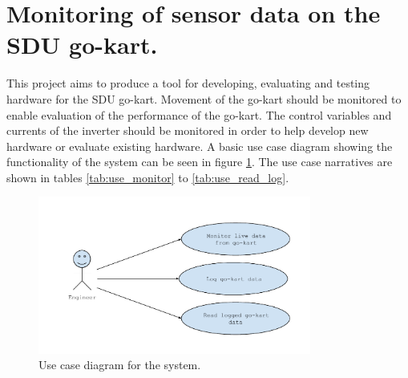 \section{Monitoring of sensor data on the SDU go-kart.}
This project aims to produce a tool for developing, evaluating and testing hardware for the SDU go-kart.
Movement of the go-kart should be monitored to enable evaluation of the performance of the go-kart.
The control variables and currents of the inverter should be monitored in order to help develop new hardware or evaluate existing hardware.
A basic use case diagram showing the functionality of the system can be seen in figure \ref{fig:use_cases}.
The use case narratives are shown in tables \ref{tab:use_monitor} to \ref{tab:use_read_log}.
\begin{figure}[h]
 	\centering
    \includegraphics[width=0.8\textwidth]{graphics/use_cases}
    \caption{Use case diagram for the system.}
    \label{fig:use_cases}
\end{figure}


